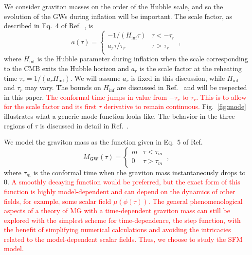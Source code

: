 \documentclass[prd,twocolumn,aps,psfig,nofootinbib,nobibnotes,superscriptaddress,preprintnumbers,times]{revtex4-2}
\def\red{\textcolor{red}}
\begin{document}
We consider graviton masses on the order of the Hubble scale, and so the evolution of the GWs during inflation will be important.
The scale factor, as described in Eq.\ 4 of Ref.\ \cite{Fujita:2018ehq}, is
\begin{equation}\label{eqn:scale_fac}
    a(\tau) = 
    \begin{cases}
        -1/(H_{\inf}\tau) & \tau < -\tau_r \\
        a_r \tau/\tau_r & \tau > \tau_r \\
   \end{cases} \ ,
\end{equation}
where $H_{\inf}$ is the Hubble parameter during inflation when the scale corresponding to the CMB exits the Hubble horizon and $a_r$ is the scale factor at the reheating time $\tau_r = 1/(a_r H_{\inf})$. We will assume $a_r$ is fixed in this discussion, while $H_{\inf}$ and $\tau_r$ may vary. The bounds on $H_{\inf}$ are discussed in Ref.\ \cite{Jiang:2015qor} and will be respected in this paper. \red{The conformal time jumps in value from $-\tau_r$ to $\tau_r$. This is to allow for the scale factor and its first $\tau$ derivative to remain continuous.} Fig.\ \ref{fig:mode} illustrates what a generic mode function looks like. The behavior in the three regions of $\tau$ is discussed in detail in Ref.\ \cite{Fujita:2018ehq}.

We model the graviton mass as the function given in Eq.\ 5 of Ref.\ \cite{Fujita:2018ehq}
\begin{equation}\label{eqn:mass_case}
    M_\text{GW}(\tau) = 
    \begin{cases}
        m & \tau < \tau_m \\
        0 & \tau > \tau_m
   \end{cases} \ ,
\end{equation} 
where $\tau_m$ is the conformal time when the graviton mass instantaneously drops to 0. \red{A smoothly decaying function would be preferred, but the exact form of this function is highly model-dependent and can depend on the dynamics of other fields, for example, some scalar field $\mu(\phi(\tau))$. The general phenomenological aspects of a theory of MG with a time-dependent graviton mass can still be explored with the simplest scheme for time-dependence, the step function, with the benefit of simplifying numerical calculations and avoiding the intricacies related to the model-dependent scalar fields. Thus, we choose to study the SFM model.}
\end{document}
